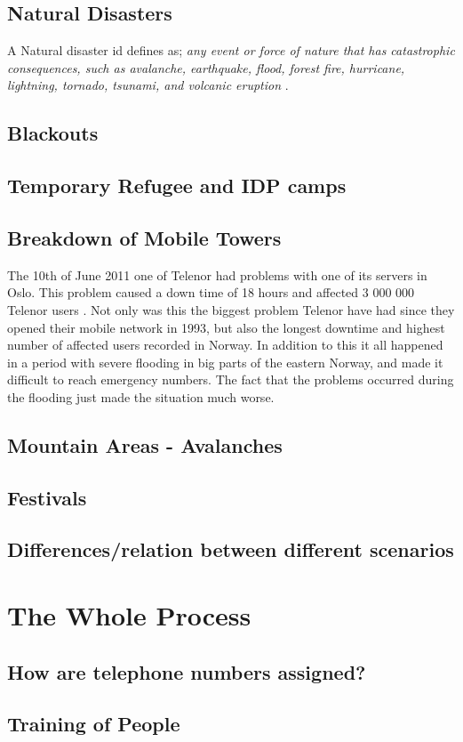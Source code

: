 \subsection{Natural Disasters}
A Natural disaster id defines as; \textit{any event or force of nature that has catastrophic consequences, such as avalanche, earthquake, flood, forest fire, hurricane, lightning, tornado, tsunami, and volcanic eruption} \cite{naturalDisaster}.


\subsection{Blackouts}

\subsection{Temporary Refugee and IDP camps}

\subsection{Breakdown of Mobile Towers}


The 10th of June 2011 one of Telenor had problems with one of its servers in Oslo. This problem caused a down time of 18 hours and affected 3 000 000 Telenor users \cite{listeNedetid}. Not only was this the biggest problem Telenor have had since they opened their mobile network in 1993, but also the longest downtime and highest number of affected users recorded in Norway. In addition to this it all happened in a period with severe flooding in big parts of the eastern Norway, and made it difficult to reach emergency numbers. The fact that the problems occurred during the flooding just made the situation much worse. \cite{TelenorNede}

\subsection{Mountain Areas - Avalanches}

\subsection{Festivals}

\subsection{Differences/relation between different scenarios}




\section{The Whole Process}

\subsection{How are telephone numbers assigned?}

\subsection{Training of People}